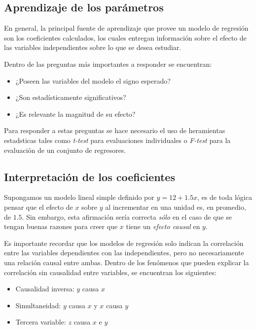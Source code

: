 \documentclass[
]{book}
\providecommand{\tightlist}{%
  \setlength{\itemsep}{0pt}\setlength{\parskip}{0pt}}
\begin{document}
\hypertarget{aprendizaje-de-los-paruxe1metros}{%
\subsection{Aprendizaje de los parámetros}\label{aprendizaje-de-los-paruxe1metros}}

En general, la principal fuente de aprendizaje que provee un modelo de
regresión son los coeficientes calculados, los cuales entregan
información sobre el efecto de las variables independientes sobre lo que
se desea estudiar.

Dentro de las preguntas más importantes a responder se encuentran:

\begin{itemize}
\tightlist
\item
  ¿Poseen las variables del modelo el signo esperado?
\item
  ¿Son estadísticamente significativos?
\item
  ¿Es relevante la magnitud de su efecto?
\end{itemize}

Para responder a estas preguntas se hace necesario el uso de heramientas
estadsticas tales como \emph{t-test} para evaluaciones individuales o
\emph{F-test} para la evaluación de un conjunto de regresores.

\hypertarget{interpretaciuxf3n-de-los-coeficientes}{%
\subsection{Interpretación de los coeficientes}\label{interpretaciuxf3n-de-los-coeficientes}}

Supongamos un modelo lineal simple definido por \(y = 12 + 1.5x\), es de
toda lógica pensar que el efecto de \(x\) sobre \(y\) al incrementar en una
unidad es, en promedio, de \(1.5\). Sin embargo, esta afirmación sería
correcta \emph{sólo} en el caso de que se tengan buenas razones para creer
que \(x\) tiene un \emph{efecto causal} en \(y\).

Es importante recordar que los modelos de regresión solo indican la
correlación entre las variables dependientes con las independientes,
pero no necesariamente una relación causal entre ambas. Dentro de los
fenómenos que pueden explicar la correlación sin causalidad entre
variables, se encuentran los siguientes:

\begin{itemize}
\tightlist
\item
  Causalidad inversa: \(y\) causa \(x\)
\item
  Simultaneidad: \(y\) causa \(x\) y \(x\) causa \(y\)
\item
  Tercera variable: \(z\) causa \(x\) e \(y\)
\end{itemize}
\end{document}
